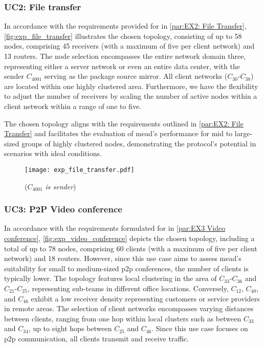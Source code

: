 \subsubsection{UC2: File transfer} %
\label{par:implEX2: File transfer}
In accordance with the requirements provided for \ucii{} in
    \autoref{par:EX2: File Transfer}, \autoref{fig:exp_file_transfer}
    illustrates the chosen topology, consisting of up to 58 nodes, comprising
    45 receivers (with a maximum of five per client network) and 13 routers.
The node selection encompasses the entire network domain three, representing
    either a server network or even an entire data center, with the sender
    $C_{4001}$ serving as the package source mirror. 
All client networks ($C_{30}$-$C_{38}$) are located within one highly
    clustered area.
Furthermore, we have the flexibility to adjust the number of receivers by
    scaling the number of active nodes within a client network within a range
    of one to five.

The chosen topology aligns with the requirements outlined in
    \autoref{par:EX2: File Transfer} and facilitates the evaluation of
    \gls{mead}'s performance for mid to large-sized groups of highly clustered
    nodes, demonstrating the protocol's potential in scenarios with ideal
    conditions.

\begin{figure}
    \begin{center}
        \texttt{[image: exp\_file\_transfer.pdf]}
    \end{center}
    \caption[UC2: File Transfer]{\nucii{} ($C_{4001}$ \textit{is sender})}
    \label{fig:exp_file_transfer}
\end{figure}

\subsubsection{UC3: P2P Video conference} %
\label{par:impl EX3 Video conference}
In accordance with the requirements formulated for \uciii{} in
    \autoref{par:EX3 Video conference}, \autoref{fig:exp_video_conference}
    depicts the chosen topology, including a total of up to 78 nodes, comprising
    60 clients (with a maximum of five per client network) and 18 routers.
However, since this use case aims to assess \gls{mead}'s suitability for small
    to medium-sized \gls{p2p} conferences, the number of clients is typically
    lower.
The topology features local clustering in the area of $C_{33}$-$C_{36}$
    and $C_{21}$-$C_{25}$, representing sub-teams in different office locations.
Conversely, $C_{12}$, $C_{40}$, and $C_{46}$ exhibit a low receiver density
    representing customers or service providers in remote areas.
The selection of client networks encompasses varying distances between clients,
    ranging from one hop within local clusters such as between $C_{33}$ and
    $C_{34}$, up to eight hops between $C_{25}$ and $C_{46}$.
Since this use case focuses on \gls{p2p} communication, all clients transmit
    and receive traffic.

